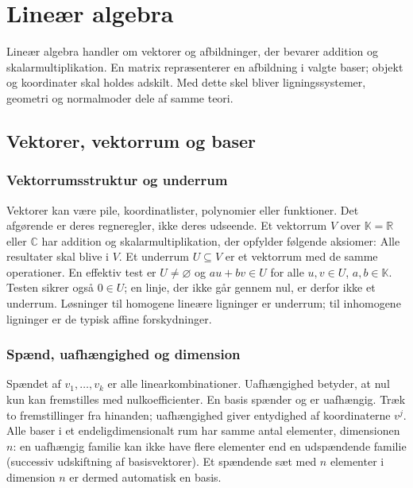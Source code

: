 \chapter{Lineær algebra}
\label{ch:b1-lineaer}
Lineær algebra handler om vektorer og afbildninger, der bevarer addition
og skalarmultiplikation. En matrix repræsenterer en afbildning i valgte
baser; objekt og koordinater skal holdes adskilt. Med dette skel bliver
ligningssystemer, geometri og normalmoder dele af samme teori.

\section{Vektorer, vektorrum og baser}
\subsection{Vektorrumsstruktur og underrum}
Vektorer kan være pile, koordinatlister, polynomier eller funktioner.
Det afgørende er deres regneregler, ikke deres udseende.
Et vektorrum $V$ over $\mathbb K=\mathbb R$ eller $\mathbb C$ har addition
og skalarmultiplikation, der opfylder følgende aksiomer:
Alle resultater skal blive i $V$. Et underrum $U\subseteq V$ er et
vektorrum med de samme operationer. En effektiv test er
$U\ne\varnothing$ og $au+bv\in U$ for alle $u,v\in U$, $a,b\in\mathbb K$.
Testen sikrer også $0\in U$; en linje, der ikke går gennem nul, er derfor
ikke et underrum. Løsninger til homogene lineære ligninger er underrum;
til inhomogene ligninger er de typisk affine forskydninger.



\subsection{Spænd, uafhængighed og dimension}
Spændet af $v_1,\ldots,v_k$ er alle linearkombinationer.
Uafhængighed betyder, at nul kun kan fremstilles med nulkoefficienter.
En basis spænder og er uafhængig. Træk to fremstillinger fra hinanden;
uafhængighed giver entydighed af koordinaterne $v^j$.
Alle baser i et endeligdimensionalt rum har samme antal elementer,
dimensionen $n$: en uafhængig familie kan ikke have flere elementer end
en udspændende familie (successiv udskiftning af basisvektorer).
Et spændende sæt med $n$ elementer i dimension $n$ er dermed automatisk en basis.


